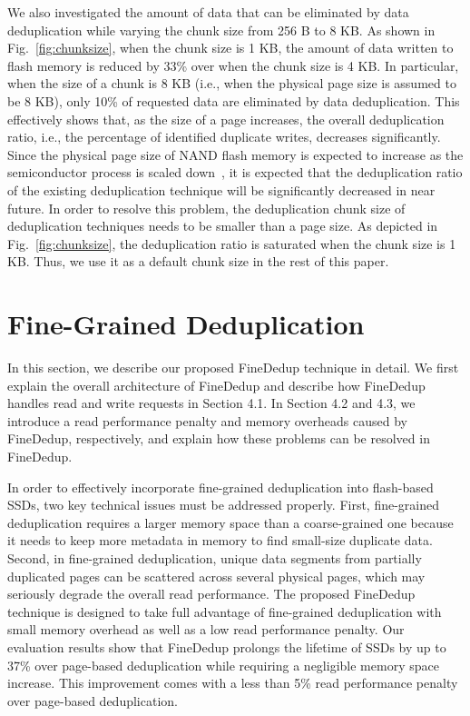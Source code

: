 We also investigated the amount of data that can be eliminated by data deduplication 
while varying the chunk size from 256 B to 8 KB.
As shown in Fig.~\ref{fig:chunksize}, 
when the chunk size is 1 KB, 
the amount of data written to flash memory is reduced by 33\% over when the chunk size is 4 KB.
In particular, when the size of a chunk is 8 KB (i.e., when the physical page size is assumed to be 8 KB),
only 10\% of requested data are eliminated by data deduplication.
This effectively shows that, as the size of a page increases,
the overall deduplication ratio, i.e., the percentage of identified duplicate writes, decreases significantly.
Since the physical page size of NAND flash memory is expected to increase as the semiconductor process is scaled down~\cite{tlc,16kpage},
it is expected that the deduplication ratio of the existing deduplication technique will be significantly 
decreased in near future.
In order to resolve this problem, the deduplication chunk size of deduplication techniques needs to be smaller than a page size.
As depicted in Fig.~\ref{fig:chunksize}, 
the deduplication ratio is saturated when the chunk size is 1 KB.
Thus, we use it as a default chunk size in the rest of this paper.

\section{Fine-Grained Deduplication}

In this section, we describe our proposed FineDedup technique in detail.
We first explain the overall architecture of FineDedup and 
describe how FineDedup handles read and write requests in Section 4.1.
In Section 4.2 and 4.3,
we introduce a read performance penalty and memory overheads caused by FineDedup, respectively,
and explain how these problems can be resolved in FineDedup.


In order to effectively incorporate fine-grained deduplication into flash-based SSDs,
two key technical issues must be addressed properly.
First, fine-grained deduplication requires a larger memory space than a coarse-grained one 
because it needs to keep more metadata in memory to find small-size duplicate data.
Second, in fine-grained deduplication, 
unique data segments from partially duplicated pages can be scattered across several physical pages,
which may seriously degrade the overall read performance.
The proposed FineDedup technique is designed to take full advantage of fine-grained deduplication
with small memory overhead as well as a low read performance penalty.
Our evaluation results show that 
FineDedup prolongs the lifetime of SSDs by up to 37\% over page-based deduplication
while requiring a negligible memory space increase.
This improvement comes with a less than 5\% read performance penalty over page-based deduplication.


